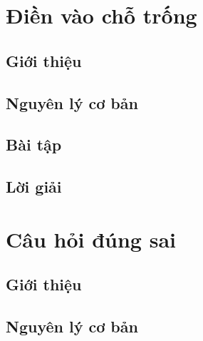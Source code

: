 \documentclass[11pt,openany]{book}
\theoremstyle{definition}
\theoremstyle{plain}
\begin{document}

\chapter{Điền vào chỗ trống}
\minitoc %
\thispagestyle{empty}

\section{Giới thiệu}

\section{Nguyên lý cơ bản}

\section{Bài tập}


\indebai
\begin{enumerate}[]
\foreachproblem[btdiencho]{\item\causo\thisproblem}
\end{enumerate}

\section{Lời giải}

\indebailoigiai

\begin{enumerate}[]
\foreachproblem[btdiencho]{\item\causo\thisproblem}
\end{enumerate}
\chapter{Câu hỏi đúng sai}
\minitoc %
\thispagestyle{empty}

\section{Giới thiệu}

\section{Nguyên lý cơ bản}
\end{document}
